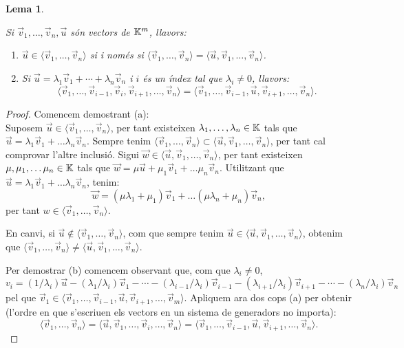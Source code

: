 \documentclass[
  11pt,
]{book}
\numberwithin{dummy}{section}
\theoremstyle{maincolornumbox}
\theoremstyle{blacknumex}
\theoremstyle{blacknumbox}
\theoremstyle{maincolornum}
\newtheorem{lemmaT}{Lema}[chapter]
\newenvironment{lemma}{\begin{pBox}\begin{lemmaT}}{\end{lemmaT}\end{pBox}}
\begin{document}
\begin{lemma}
\protect\hypertarget{lem:generadors}{}\label{lem:generadors}

Si
\(\vec v_1, \dots , \vec v_n, \vec u\) són vectors de \(\mathbb{K}^m\), llavors:

\begin{enumerate}
\def\labelenumi{\arabic{enumi}.}
\item
  \(\vec u\in \langle \vec v_1, \dots , \vec v_n \rangle\) si i només si
  \(\langle \vec v_1, \dots , \vec v_n \rangle=\langle\vec u, \vec v_1, \dots , \vec v_n \rangle\).
\item
  Si \(\vec u = \lambda_1 \vec v_1 + \cdots + \lambda_n \vec v_n\) i \(i\)
  és un índex tal que \(\lambda_i\neq 0\), llavors:
  \[\langle \vec v_1,\dots,\vec v_{i-1},\vec v_i , \vec v_{i+1}, \dots , \vec v_n\rangle=\langle \vec v_1, \dots,\vec v_{i-1},\vec u , \vec v_{i+1},\dots,\vec v_n\rangle.\]
\end{enumerate}

\end{lemma}

\begin{proof}
Comencem demostrant (a):\\
Suposem \(\vec u\in \langle \vec v_1, \dots , \vec v_n \rangle\), per tant
existeixen \(\lambda_1, \dots, \lambda_n\in\mathbb{K}\) tals que
\(\vec u=\lambda_1\vec v_1+\dots \lambda_n\vec v_n\). Sempre tenim
\(\langle \vec v_1, \dots , \vec v_n \rangle\subset\langle\vec u, \vec v_1, \dots , \vec v_n \rangle\),
per tant cal comprovar l'altre inclusió. Sigui
\(\vec w \in \langle\vec u, \vec v_1, \dots , \vec v_n \rangle\), per tant
existeixen \(\mu,\mu_1,\dots \mu_n\in\mathbb{K}\) tals que
\(\vec w=\mu \vec u+\mu_1\vec v_1+\dots \mu_n\vec v_n\). Utilitzant que
\(\vec u=\lambda_1\vec v_1+\dots \lambda_n\vec v_n\), tenim:
\[\vec w=(\mu\lambda_1+\mu_1)\vec v_1+\dots (\mu\lambda_n+\mu_n)\vec v_n ,\]
per tant \(w \in \langle \vec v_1, \dots , \vec v_n \rangle\).

En canvi, si \(\vec u\notin \langle \vec v_1, \dots , \vec v_n \rangle\),
com que sempre tenim
\(\vec u\in \langle\vec u, \vec v_1, \dots , \vec v_n \rangle\), obtenim
que
\(\langle \vec v_1, \dots , \vec v_n \rangle\neq\langle\vec u, \vec v_1, \dots , \vec v_n \rangle\).

Per demostrar (b) comencem observant que, com que \(\lambda_i\neq 0\),
\[v_i=(1/\lambda_i) \vec u -(\lambda_1/\lambda_i) \vec v_1- \cdots-(\lambda_{i-1}/\lambda_i) \vec v_{i-1} - (\lambda_{i+1}/\lambda_i) \vec v_{i+1} - \cdots -(\lambda_n/\lambda_i) \vec v_n\]
pel que
\(\vec v_1 \in \langle \vec v_1, \dots,\vec v_{i-1},\vec u , \vec v_{i+1},\dots,\vec v_m\rangle\).
Apliquem ara dos cops (a) per obtenir (l'ordre en que s'escriuen els
vectors en un sistema de generadors no importa):
\[\langle \vec v_1, \dots , \vec v_n\rangle=
    \langle \vec u,\vec v_1, \dots, \vec v_i, \dots , \vec v_n\rangle=
    \langle \vec v_1, \dots,\vec v_{i-1},\vec u , \vec v_{i+1},\dots,\vec v_n\rangle.\]
\end{proof}
\end{document}
